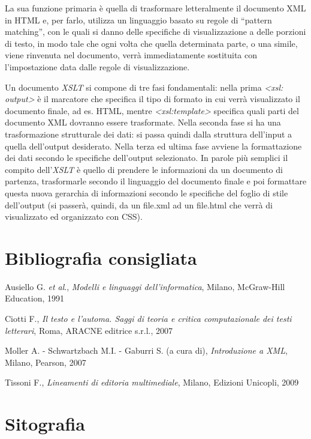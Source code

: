 \documentclass[
  b5paper,
  twoside,
  12pt,
  chapterprefix=false,
  bibliography=totocnumbered,
  parskip=false]{scrbook}
\begin{document}
La sua funzione primaria è quella di trasformare letteralmente il
documento XML in HTML e, per farlo, utilizza un linguaggio basato su
regole di \enquote{pattern matching}, con le quali si danno delle specifiche di
visualizzazione a delle porzioni di testo, in modo tale che ogni volta
che quella determinata parte, o una simile, viene rinvenuta nel
documento, verrà immediatamente sostituita con l'impostazione data dalle
regole di visualizzazione.

Un documento \emph{XSLT} si compone di tre fasi fondamentali: nella prima
\emph{\textless xsl: output\textgreater{}} è il marcatore che specifica il tipo di formato in cui
verrà visualizzato il documento finale, ad es. HTML, mentre
\emph{\textless xsl:template\textgreater{}} specifica quali parti del documento XML dovranno
essere trasformate. Nella seconda fase si ha una trasformazione
strutturale dei dati: si passa quindi dalla struttura dell'input a
quella dell'output desiderato. Nella terza ed ultima fase avviene la
formattazione dei dati secondo le specifiche dell'output selezionato. In
parole più semplici il compito dell'\emph{XSLT} è quello di prendere le
informazioni da un documento di partenza, trasformarle secondo il
linguaggio del documento finale e poi formattare questa nuova gerarchia
di informazioni secondo le specifiche del foglio di stile dell'output
(si passerà, quindi, da un file.xml ad un file.html che verrà di
visualizzato ed organizzato con CSS).

\hypertarget{bibliografia-consigliata-27}{%
\section*{Bibliografia consigliata}\label{bibliografia-consigliata-27}}

Ausiello G. \emph{et al}., \emph{Modelli e linguaggi dell'informatica}, Milano,
McGraw-Hill Education, 1991

Ciotti F., \emph{Il testo e l'automa. Saggi di teoria e critica
computazionale dei testi letterari}, Roma, ARACNE editrice s.r.l., 2007

Moller A. - Schwartzbach M.I. - Gaburri S. (a cura di), \emph{Introduzione a
XML}, Milano, Pearson, 2007

Tissoni F., \emph{Lineamenti di editoria multimediale}, Milano, Edizioni
Unicopli, 2009

\hypertarget{sitografia-34}{%
\section*{Sitografia}\label{sitografia-34}}
\end{document}
